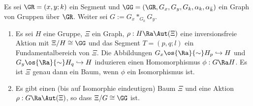 \SATZ \label{satz_segment}
Es sei $\GR=(x,y;k)$ ein Segment und
$\GG=(\GR,G_x,G_y,G_k,\alpha_k,\alpha_{\bar{k}})$
ein Graph von Gruppen über $\GR$.
Weiter sei $G:=G_x *_{G_k} G_y$.
\begin{enumerate}
\item Es sei $H$ eine Gruppe, $\Xi$ ein Graph,
$\rho:H\Ra\Aut(\Xi)$ eine inversionsfreie Aktion
mit $\Xi/H\cong\GG$ und das Segment $T=(p,q;l)$ ein
Fundamentalbereich von $\Xi$.
Die Abbildungen
$G_x \os{\Ra}{\sim} H_p \hookrightarrow H$ und
$G_y \os{\Ra}{\sim} H_q \hookrightarrow H$
induzieren einen Homomorphismus
$\phi:G \Ra H$. Es ist $\Xi$ genau dann ein Baum, wenn
$\phi$ ein Isomorphismus ist.
\item Es gibt einen (bis auf Isomorphie eindeutigen) Baum $\Xi$ 
und eine Aktion $\rho:G\Ra\Aut(\Xi)$, so dass
$\Xi/G\cong\GG$ ist.
\end{enumerate}
